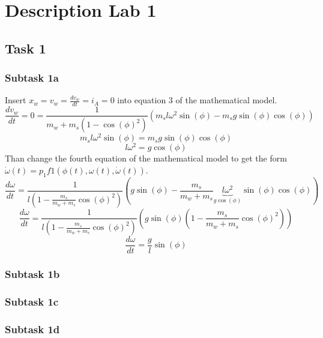 \documentclass[a4paper, 12pt]{scrartcl}
\begin{document}
\section{Description Lab 1}

\subsection{Task 1}
\subsubsection{Subtask 1a}
Insert $x_w = v_w = \frac{dv_w}{dt} = i_A = 0$ into equation 3 of the mathematical model. \\
\begin{equation}
	\frac{dv_w}{dt} = 0 = \frac{1}{m_w + m_s(1-\cos(\phi)^2)} (m_s l \omega^2 \sin(\phi) - m_s g \sin(\phi) \cos(\phi))
\end{equation}
\begin{equation}
	m_s l \omega^2 \sin(\phi) = m_s g \sin(\phi) \cos(\phi)
\end{equation}
\begin{equation}
	l \omega^2 = g \cos(\phi)
\end{equation}
Than change the fourth equation of the mathematical model to get the form $\dot{\omega}(t) = p_1 f1(\phi(t), \omega(t), \dot{\omega}(t))$.
\begin{equation}
	\frac{d\omega}{dt} = \frac{1}{l\left(1-\frac{m_s}{m_w + m_s} \cos(\phi)^2\right)} \left( g \sin(\phi) - \frac{m_s}{m_w + m_s} \underbrace{l \omega^2}_{g \cos(\phi)} \sin(\phi) \cos(\phi) \right)
\end{equation}
\begin{equation}
	\frac{d\omega}{dt} = \frac{1}{l\left(1-\frac{m_s}{m_w + m_s} \cos(\phi)^2\right)} \left( g \sin(\phi) \left(1-\frac{m_s}{m_w + m_s} \cos(\phi)^2\right) \right)
\end{equation}
\begin{equation}
	\frac{d\omega}{dt} = \frac{g}{l} \sin(\phi)
\end{equation}
\subsubsection{Subtask 1b}
\subsubsection{Subtask 1c}
\subsubsection{Subtask 1d}
\end{document}
